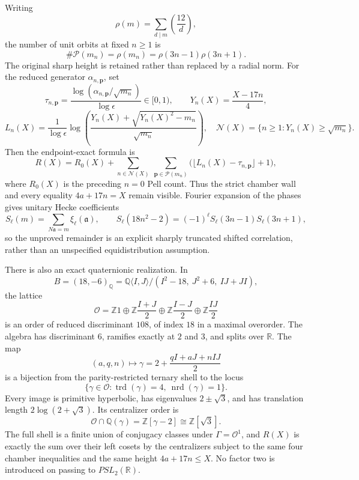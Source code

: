 \documentclass[10pt,letterpaper]{article}
\begin{document}
Writing
\[
 \rho(m)=\sum_{d\mid m}\left(\frac{12}{d}\right),
\]
the number of unit orbits at fixed $n\geq1$ is
\[
 \#\mathcal P(m_n)=\rho(m_n)
 =\rho(3n-1)\rho(3n+1).
\]
The original sharp height is retained rather than replaced by a radial norm.
For the reduced generator $\alpha_{n,\mathbf p}$, set
\[
 \tau_{n,\mathbf p}=
 \frac{\log(\alpha_{n,\mathbf p}/\sqrt{m_n})}{\log\epsilon}\in[0,1),
 \qquad Y_n(X)=\frac{X-17n}{4},
\]
\[
 L_n(X)=\frac1{\log\epsilon}
 \log\!\left(
 \frac{Y_n(X)+\sqrt{Y_n(X)^2-m_n}}{\sqrt{m_n}}
 \right),
 \quad
 \mathcal N(X)=\{n\geq1:Y_n(X)\geq\sqrt{m_n}\}.
\]
Then the endpoint-exact formula is
\[
 R(X)=R_0(X)+
 \sum_{n\in\mathcal N(X)}\ \sum_{\mathbf p\in\mathcal P(m_n)}
 \bigl(\lfloor L_n(X)-\tau_{n,\mathbf p}\rfloor+1\bigr),
\]
where $R_0(X)$ is the preceding $n=0$ Pell count.  Thus the strict
chamber wall and every equality $4a+17n=X$ remain visible.  Fourier
expansion of the phases gives unitary Hecke coefficients
\[
 S_\ell(m)=\sum_{N\mathfrak a=m}\xi_\ell(\mathfrak a),\qquad
 S_\ell(18n^2-2)=(-1)^\ell S_\ell(3n-1)S_\ell(3n+1),
\]
so the unproved remainder is an explicit sharply truncated shifted
correlation, rather than an unspecified equidistribution assumption.

There is also an exact quaternionic realization.  In
\[
 B=(18,-6)_{\mathbb Q}
 =\mathbb Q\langle I,J\rangle/(I^2-18,\ J^2+6,\ IJ+JI),
\]
the lattice
\[
 \mathcal O=\mathbb Z1\oplus
 \mathbb Z\frac{I+J}{2}\oplus
 \mathbb Z\frac{I-J}{2}\oplus\mathbb Z\frac{IJ}{2}
\]
is an order of reduced discriminant $108$, of index $18$ in a maximal
overorder.  The algebra has discriminant $6$, ramifies exactly at $2$
and $3$, and splits over $\mathbb R$.  The map
\[
 (a,q,n)\longmapsto
 \gamma=2+\frac{qI+aJ+nIJ}{2}
\]
is a bijection from the parity-restricted ternary shell to the locus
\[
 \{\gamma\in\mathcal O:\operatorname{trd}(\gamma)=4,
                           \ \operatorname{nrd}(\gamma)=1\}.
\]
Every image is primitive hyperbolic, has eigenvalues $2\pm\sqrt3$, and
has translation length $2\log(2+\sqrt3)$.  Its centralizer order is
\[
 \mathcal O\cap\mathbb Q(\gamma)=
 \mathbb Z[\gamma-2]\cong\mathbb Z[\sqrt3].
\]
The full shell is a finite union of conjugacy classes under
$\Gamma=\mathcal O^1$, and $R(X)$ is exactly the sum over their left
cosets by the centralizers subject to the same four chamber inequalities and
the same height $4a+17n\leq X$.  No factor two is introduced on passing to
$PSL_2(\mathbb R)$.
\end{document}
